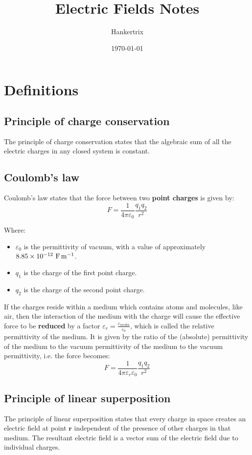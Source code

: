 \documentclass[11pt]{article}
\author{Hankertrix}
\date{\today}
\title{Electric Fields Notes}
\begin{document}
\maketitle
\setcounter{tocdepth}{2}
\tableofcontents \clearpage\section{Definitions}
\label{sec:orgb879637}

\subsection{Principle of charge conservation}
\label{sec:orgbb709ac}
The principle of charge conservation states that the algebraic sum of all the electric charges in any closed system is constant.
\subsection{Coulomb's law}
\label{sec:org0ad0969}
Coulomb's law states that the force between two \textbf{point charges} is given by:
\[F = \frac{1}{4 \pi \varepsilon_0} \frac{q_1 q_2}{r^2}\]

Where:
\begin{itemize}
\item \(\varepsilon_0\) is the permittivity of vacuum, with a value of approximately \(\\ 8.85 \times 10^{-12} \ \unit{F.m^{-1}}\).
\item \(q_1\) is the charge of the first point charge.
\item \(q_2\) is the charge of the second point charge.
\end{itemize}

If the charges reside within a medium which contains atoms and molecules, like air, then the interaction of the medium with the charge will cause the effective force to be \textbf{reduced} by a factor \(\varepsilon_r = \frac{\varepsilon_{media}}{\varepsilon_0}\), which is called the relative permittivity of the medium. It is given by the ratio of the (absolute) permittivity of the medium to the vacuum permittivity of the medium to the vacuum permittivity, i.e. the force becomes:
\[F = \frac{1}{4 \pi \varepsilon_r \varepsilon_0} \frac{q_1 q_2}{r^2}\]

\newpage
\subsection{Principle of linear superposition}
\label{sec:org7a30c9c}
The principle of linear superposition states that every charge in space creates an electric field at point \(\boldsymbol{r}\) independent of the presence of other charges in that medium. The resultant electric field is a vector sum of the electric field due to individual charges.
\end{document}
